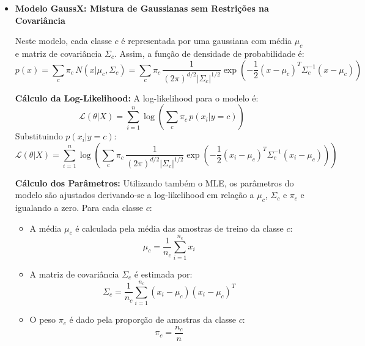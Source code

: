 \begin{enumerate}
\begin{tcolorbox}[title=Resposta:]
\begin{itemize}
           

        \end{itemize}

        \end{tcolorbox}

        \begin{tcolorbox}[title=Resposta (continuação):]

        \begin{itemize}

            \item \textbf{Modelo GaussX: Mistura de Gaussianas sem Restrições na Covariância}
        
            Neste modelo, cada classe \( c \) é representada por uma gaussiana com média \( \mu_c \) e matriz de covariância \( \Sigma_c \). Assim, a função de densidade de probabilidade é:
            \[
            p(x) = \sum_{c} \pi_c \, N(x | \mu_c, \Sigma_c) = \sum_{c} \pi_c \, \frac{1}{(2\pi)^{d/2} |\Sigma_c|^{1/2}} \exp \left( -\frac{1}{2} (x - \mu_c)^T \Sigma_c^{-1} (x - \mu_c) \right)
            \]

            \textbf{Cálculo da Log-Likelihood:}  
            A log-likelihood para o modelo é:
            \[
            \mathcal{L}(\theta | X) = \sum_{i=1}^n \log \left( \sum_{c} \pi_c \, p(x_i | y=c) \right)
            \]
            Substituindo \( p(x_i | y=c) \):
            \[
            \mathcal{L}(\theta | X) = \sum_{i=1}^n \log \left( \sum_{c} \pi_c \, \frac{1}{(2\pi)^{d/2} |\Sigma_c|^{1/2}} \exp \left( -\frac{1}{2} (x_i - \mu_c)^T \Sigma_c^{-1} (x_i - \mu_c) \right) \right)
            \]

            \textbf{Cálculo dos Parâmetros:}  
            Utilizando também o MLE, os parâmetros do modelo são ajustados derivando-se a log-likelihood em relação a \( \mu_c \), \( \Sigma_c \) e \( \pi_c \) e igualando a zero.
            Para cada classe \( c \):
            \begin{itemize}
                \item A média \( \mu_c \) é calculada pela média das amostras de treino da classe \( c \):
                \[
                \mu_c = \frac{1}{n_c} \sum_{i=1}^{n_c} x_i
                \]
                \item A matriz de covariância \( \Sigma_c \) é estimada por:
                \[
                \Sigma_c = \frac{1}{n_c} \sum_{i=1}^{n_c} (x_i - \mu_c)(x_i - \mu_c)^T
                \]
                \item O peso \( \pi_c \) é dado pela proporção de amostras da classe \( c \):
                \[
                \pi_c = \frac{n_c}{n}
                \]
            \end{itemize}


\end{itemize}
\end{tcolorbox}
\end{enumerate}

